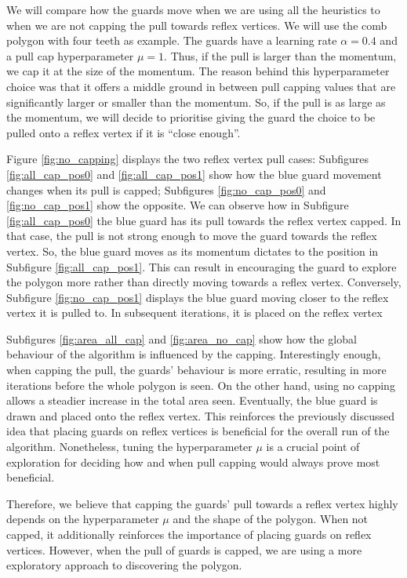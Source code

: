 We will compare how the guards move when we are using all the heuristics to when we are not capping the pull towards reflex vertices. We will use the comb polygon with four teeth as example. The guards have a learning rate $\alpha = 0.4$ and a pull cap hyperparameter $\mu = 1$. Thus, if the pull is larger than the momentum, we cap it at the size of the momentum. The reason behind this hyperparameter choice was that it offers a middle ground in between pull capping values that are significantly larger or smaller than the momentum. So, if the pull is as large as the momentum, we will decide to prioritise giving the guard the choice to be pulled onto a reflex vertex if it is ``close enough''.

Figure \ref{fig:no_capping} displays the two reflex vertex pull cases: Subfigures \ref{fig:all_cap_pos0} and \ref{fig:all_cap_pos1} show how the blue guard movement changes when its pull is capped; Subfigures \ref{fig:no_cap_pos0} and \ref{fig:no_cap_pos1} show the opposite. We can observe how in Subfigure \ref{fig:all_cap_pos0} the blue guard has its pull towards the reflex vertex capped. In that case, the pull is not strong enough to move the guard towards the reflex vertex. So, the blue guard moves as its momentum dictates to the position in Subfigure \ref{fig:all_cap_pos1}. This can result in encouraging the guard to explore the polygon more rather than directly moving towards a reflex vertex.
Conversely, Subfigure \ref{fig:no_cap_pos1} displays the blue guard moving closer to the reflex vertex it is pulled to. In subsequent iterations, it is placed on the reflex vertex

Subfigures \ref{fig:area_all_cap} and \ref{fig:area_no_cap} show how the global behaviour of the algorithm is influenced by the capping. Interestingly enough, when capping the pull, the guards' behaviour is more erratic, resulting in more iterations before the whole polygon is seen. On the other hand, using no capping allows a steadier increase in the total area seen. Eventually, the blue guard is drawn and placed onto the reflex vertex. This reinforces the previously discussed idea that placing guards on reflex vertices is beneficial for the overall run of the algorithm. Nonetheless, tuning the hyperparameter $\mu$ is a crucial point of exploration for deciding how and when pull capping would always prove most beneficial.

Therefore, we believe that capping the guards' pull towards a reflex vertex highly depends on the hyperparameter $\mu$ and the shape of the polygon. When not capped, it additionally reinforces the importance of placing guards on reflex vertices. However, when the pull of guards is capped, we are using a more exploratory approach to discovering the polygon.

